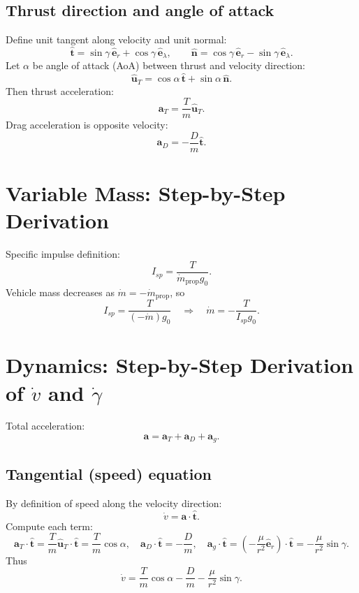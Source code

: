 \documentclass[11pt]{article}
\begin{document}
\subsection{Thrust direction and angle of attack}
Define unit tangent along velocity and unit normal:
\begin{equation}
\hat{\bm t}=\sin\gamma\,\hat{\bm e}_r+\cos\gamma\,\hat{\bm e}_\lambda,\qquad
\hat{\bm n}=\cos\gamma\,\hat{\bm e}_r-\sin\gamma\,\hat{\bm e}_\lambda.
\end{equation}
Let $\alpha$ be angle of attack (AoA) between thrust and velocity direction:
\begin{equation}
\hat{\bm u}_T=\cos\alpha\,\hat{\bm t}+\sin\alpha\,\hat{\bm n}.
\end{equation}
Then thrust acceleration:
\begin{equation}
\bm{a}_T=\frac{T}{m}\hat{\bm u}_T.
\end{equation}
Drag acceleration is opposite velocity:
\begin{equation}
\bm{a}_D=-\frac{D}{m}\hat{\bm t}.
\end{equation}

\section{Variable Mass: Step-by-Step Derivation}
Specific impulse definition:
\begin{equation}
I_{sp}=\frac{T}{\dot m_{\text{prop}}g_0}.
\end{equation}
Vehicle mass decreases as $\dot m=-\dot m_{\text{prop}}$, so
\[
I_{sp}=\frac{T}{(-\dot m)g_0}\quad\Rightarrow\quad
\boxed{\dot m=-\frac{T}{I_{sp}g_0}}.
\]

\section{Dynamics: Step-by-Step Derivation of $\dot v$ and $\dot\gamma$}
Total acceleration:
\begin{equation}
\bm{a}=\bm{a}_T+\bm{a}_D+\bm{a}_g.
\end{equation}

\subsection{Tangential (speed) equation}
By definition of speed along the velocity direction:
\begin{equation}
\dot v=\bm{a}\cdot\hat{\bm t}.
\end{equation}
Compute each term:
\[
\bm{a}_T\cdot\hat{\bm t}=\frac{T}{m}\hat{\bm u}_T\cdot\hat{\bm t}=\frac{T}{m}\cos\alpha,
\quad
\bm{a}_D\cdot\hat{\bm t}=-\frac{D}{m},
\quad
\bm{a}_g\cdot\hat{\bm t}=\left(-\frac{\mu}{r^2}\hat{\bm e}_r\right)\cdot\hat{\bm t}=-\frac{\mu}{r^2}\sin\gamma.
\]
Thus
\begin{equation}
\boxed{\dot v=\frac{T}{m}\cos\alpha-\frac{D}{m}-\frac{\mu}{r^2}\sin\gamma.}
\end{equation}
\end{document}
